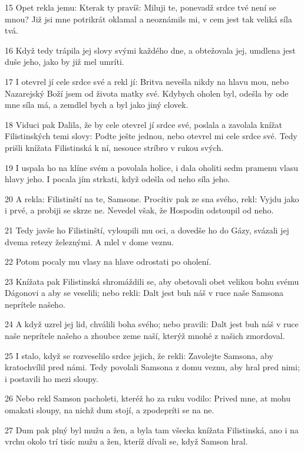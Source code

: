 \par 15 Opet rekla jemu: Kterak ty pravíš: Miluji te, ponevadž srdce tvé není se mnou? Již jsi mne potrikrát oklamal a neoznámils mi, v cem jest tak veliká síla tvá.
\par 16 Když tedy trápila jej slovy svými každého dne, a obtežovala jej, umdlena jest duše jeho, jako by již mel umríti.
\par 17 I otevrel jí cele srdce své a rekl jí: Britva nevešla nikdy na hlavu mou, nebo Nazarejský Boží jsem od života matky své. Kdybych oholen byl, odešla by ode mne síla má, a zemdlel bych a byl jako jiný clovek.
\par 18 Viduci pak Dalila, že by cele otevrel jí srdce své, poslala a zavolala knížat Filistinských temi slovy: Podte ješte jednou, nebo otevrel mi cele srdce své. Tedy prišli knížata Filistinská k ní, nesouce stríbro v rukou svých.
\par 19 I uspala ho na klíne svém a povolala holice, i dala oholiti sedm pramenu vlasu hlavy jeho. I pocala jím strkati, když odešla od neho síla jeho.
\par 20 A rekla: Filistinští na te, Samsone. Procítiv pak ze sna svého, rekl: Vyjdu jako i prvé, a probiji se skrze ne. Nevedel však, že Hospodin odstoupil od neho.
\par 21 Tedy javše ho Filistinští, vyloupili mu oci, a dovedše ho do Gázy, svázali jej dvema retezy železnými. A mlel v dome veznu.
\par 22 Potom pocaly mu vlasy na hlave odrostati po oholení.
\par 23 Knížata pak Filistinská shromáždili se, aby obetovali obet velikou bohu svému Dágonovi a aby se veselili; nebo rekli: Dalt jest buh náš v ruce naše Samsona neprítele našeho.
\par 24 A když uzrel jej lid, chválili boha svého; nebo pravili: Dalt jest buh náš v ruce naše neprítele našeho a zhoubce zeme naší, kterýž mnohé z našich zmordoval.
\par 25 I stalo, když se rozveselilo srdce jejich, že rekli: Zavolejte Samsona, aby kratochvílil pred námi. Tedy povolali Samsona z domu veznu, aby hral pred nimi; i postavili ho mezi sloupy.
\par 26 Nebo rekl Samson pacholeti, kteréž ho za ruku vodilo: Prived mne, at mohu omakati sloupy, na nichž dum stojí, a zpodepríti se na ne.
\par 27 Dum pak plný byl mužu a žen, a byla tam všecka knížata Filistinská, ano i na vrchu okolo trí tisíc mužu a žen, kteríž dívali se, když Samson hral.
